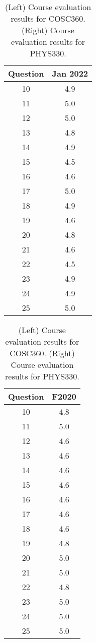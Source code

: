 \documentclass[../../main.tex]{subfiles}
\begin{document}
\begin{table}
\footnotesize
\centering
\begin{tabular}{| c | c |}
\hline
\hline
Question & Jan 2022 \\ \hline
10 & 4.9 \\ \hline
11 & 5.0 \\ \hline
12 & 5.0 \\ \hline
13 & 4.8 \\ \hline
14 & 4.9 \\ \hline
15 & 4.5 \\ \hline
16 & 4.6 \\ \hline
17 & 5.0 \\ \hline
18 & 4.9 \\ \hline
19 & 4.6 \\ \hline
20 & 4.8 \\ \hline
21 & 4.6 \\ \hline
22 & 4.5 \\ \hline
23 & 4.9 \\ \hline
24 & 4.9 \\ \hline
25 & 5.0 \\ \hline
\hline
\end{tabular}
\begin{tabular}{| c | c |}
\hline
\hline
Question & F2020 \\ \hline
10 & 4.8 \\ \hline
11 & 5.0 \\ \hline
12 & 4.6 \\ \hline
13 & 4.6 \\ \hline
14 & 4.6 \\ \hline
15 & 4.6 \\ \hline
16 & 4.6 \\ \hline
17 & 4.6 \\ \hline
18 & 4.6 \\ \hline
19 & 4.8 \\ \hline
20 & 5.0 \\ \hline
21 & 5.0 \\ \hline
22 & 4.8 \\ \hline
23 & 5.0 \\ \hline
24 & 5.0 \\ \hline
25 & 5.0 \\ \hline
\hline
\end{tabular}
\caption{\label{tab:eval_dsp} (Left) Course evaluation results for COSC360. (Right) Course evaluation results for PHYS330.}
\end{table}
\end{document}
